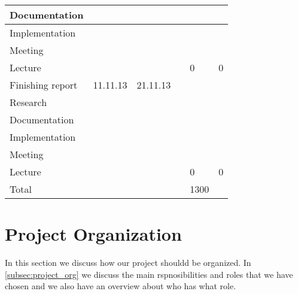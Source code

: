\documentclass{report}
\begin{document}
\begin{tabular}{| l | l | l | l | p{1.25 cm} | p{1.25 cm}|}
Documentation &  &   &  &  &  \\ \hline
Implementation &  &   &  &   &  \\ \hline
Meeting &  &   &  &   &  \\ \hline
Lecture &  &   &  &  0 & 0 \\ \hline
Finishing report & 11.11.13  & 21.11.13 &  &  &\\ \hline
Research &  &   &  &  &  \\ \hline
Documentation &  &   &  &  &  \\ \hline
Implementation &  &   &  &   &  \\ \hline
Meeting &  &   &  &   &  \\ \hline
Lecture &  &   &  &  0 & 0 \\ \hline
Total &  &   &  &  1300 &  \\ \hline
\end{tabular}

\newpage
\section{Project Organization} \label{sec:project_organization}
In this section we discuss how our project shouldd be organized. In \ref{subsec:project_org} we discuss the main rspnosibilities and roles that we have chosen and we also have an overview about who has what role.
\end{document}
